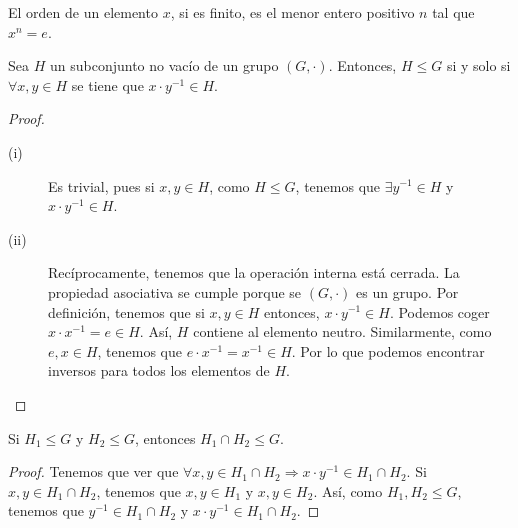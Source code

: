 \begin{observation}
\normalfont El orden de un elemento $\displaystyle x $, si es finito, es el menor entero positivo $\displaystyle n $  tal que $\displaystyle x^{n} = e $.
\end{observation}

\begin{fprop}[]
\normalfont Sea $\displaystyle H $ un subconjunto no vacío de un grupo $\displaystyle \left(G, \cdot\right) $. Entonces, $\displaystyle H \leq G $ si y solo si $\displaystyle \forall x,y\in H $ se tiene que $\displaystyle x \cdot y^{-1} \in H $.
\end{fprop}

\begin{proof}
\begin{description}
\item[(i)] Es trivial, pues si $\displaystyle x, y \in H $, como $\displaystyle H \leq G $, tenemos que $\displaystyle \exists y^{-1} \in H $ y $\displaystyle x \cdot y^{-1} \in H $.
\item[(ii)] Recíprocamente, tenemos que la operación interna está cerrada. La propiedad asociativa se cumple porque se $\displaystyle \left(G, \cdot\right) $ es un grupo. Por definición, tenemos que si $\displaystyle x, y \in H $ entonces, $\displaystyle x \cdot y^{-1} \in H $. Podemos coger $\displaystyle x \cdot x^{-1} = e \in H $. Así, $\displaystyle H $ contiene al elemento neutro. Similarmente, como $\displaystyle e,x \in H $, tenemos que $\displaystyle e \cdot x^{-1} = x^{-1} \in H $. Por lo que podemos encontrar inversos para todos los elementos de $\displaystyle H $. 
\end{description}
\end{proof}

\begin{fprop}[]
\normalfont Si $\displaystyle H_{1} \leq G $ y $\displaystyle H_{2} \leq G $, entonces $\displaystyle H_{1}\cap H_{2} \leq G $.
\end{fprop}

\begin{proof}
Tenemos que ver que $\displaystyle \forall x, y \in H_{1} \cap H_{2} \Rightarrow x \cdot y^{-1} \in H_{1} \cap H_{2} $. Si $\displaystyle x, y \in H_{1} \cap H_{2} $, tenemos que $\displaystyle x,y \in H_{1} $ y $\displaystyle x,y \in H_{2} $. Así, como $\displaystyle H_{1}, H_{2} \leq G $, tenemos que $\displaystyle y^{-1} \in H_{1} \cap H_{2} $ y $\displaystyle x \cdot y^{-1} \in H_{1}\cap H_{2} $.
\end{proof}

